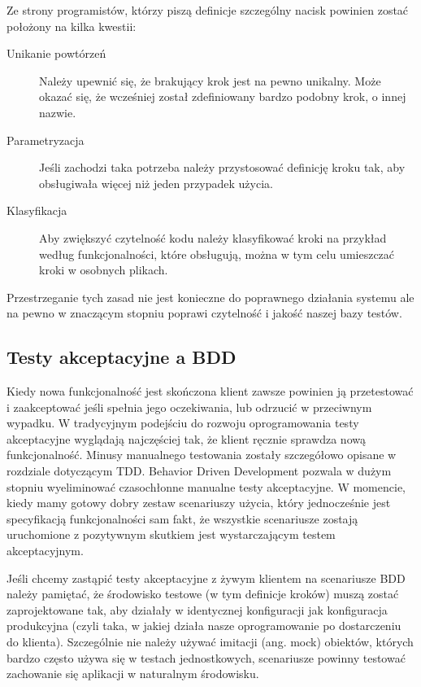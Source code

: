       Ze strony programistów, którzy piszą definicje szczególny nacisk powinien zostać położony na kilka kwestii:
      
      \begin{description}
        \item[Unikanie powtórzeń] Należy upewnić się, że brakujący krok jest na pewno unikalny. Może okazać się, że wcześniej został zdefiniowany bardzo podobny krok, o innej nazwie.
        \item[Parametryzacja] Jeśli zachodzi taka potrzeba należy przystosować definicję kroku tak, aby obsługiwała więcej niż jeden przypadek użycia.
        \item[Klasyfikacja] Aby zwiększyć czytelność kodu należy klasyfikować kroki na przykład według funkcjonalności, które obsługują, można w tym celu umieszczać kroki w osobnych plikach.
      \end{description}
      
      Przestrzeganie tych zasad nie jest konieczne do poprawnego działania systemu ale na pewno w znaczącym stopniu poprawi czytelność i jakość naszej bazy testów.
      
    \subsection{Testy akceptacyjne a BDD}
      
      Kiedy nowa funkcjonalność jest skończona klient zawsze powinien ją przetestować i zaakceptować jeśli spełnia jego oczekiwania, lub odrzucić w przeciwnym wypadku. W tradycyjnym podejściu do rozwoju oprogramowania testy akceptacyjne wyglądają najczęściej tak, że klient ręcznie sprawdza nową funkcjonalność. Minusy manualnego testowania zostały szczegółowo opisane w rozdziale dotyczącym TDD. Behavior Driven Development pozwala w dużym stopniu wyeliminować czasochłonne manualne testy akceptacyjne. W momencie, kiedy mamy gotowy dobry zestaw scenariuszy użycia, który jednocześnie jest specyfikacją funkcjonalności sam fakt, że wszystkie scenariusze zostają uruchomione z pozytywnym skutkiem jest wystarczającym testem akceptacyjnym.
      
      Jeśli chcemy zastąpić testy akceptacyjne z żywym klientem na scenariusze BDD należy pamiętać, że środowisko testowe (w tym definicje kroków) muszą zostać zaprojektowane tak, aby działały w identycznej konfiguracji jak konfiguracja produkcyjna (czyli taka, w jakiej działa nasze oprogramowanie po dostarczeniu do klienta). Szczególnie nie należy używać imitacji (ang. mock) obiektów, których bardzo często używa się w testach jednostkowych, scenariusze powinny testować zachowanie się aplikacji w naturalnym środowisku.
      
